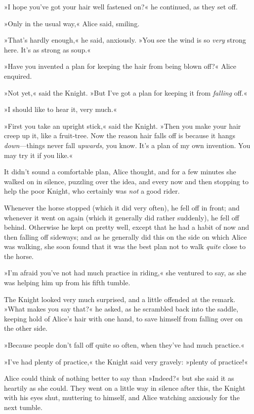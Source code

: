»I hope you've got your hair well fastened on?« he continued, as they set off.

»Only in the usual way,« Alice said, smiling.

»That's hardly enough,« he said, anxiously. »You see the wind is so \textit{very} strong here. It's as strong as soup.«

»Have you invented a plan for keeping the hair from being blown off?« Alice enquired.

»Not yet,« said the Knight. »But I've got a plan for keeping it from \textit{falling} off.«

»I should like to hear it, very much.«

»First you take an upright stick,« said the Knight. »Then you make your hair creep up it, like a fruit-tree. Now the reason hair falls off is because it hangs \textit{down}—things never fall \textit{upwards,} you know. It's a plan of my own invention. You may try it if you like.«

It didn't sound a comfortable plan, Alice thought, and for a few minutes she walked on in silence, puzzling over the idea, and every now and then stopping to help the poor Knight, who certainly was \textit{not} a good rider.

Whenever the horse stopped (which it did very often), he fell off in front; and whenever it went on again (which it generally did rather suddenly), he fell off behind. Otherwise he kept on pretty well, except that he had a habit of now and then falling off sideways; and as he generally did this on the side on which Alice was walking, she soon found that it was the best plan not to walk \textit{quite} close to the horse.

»I'm afraid you've not had much practice in riding,« she ventured to say, as she was helping him up from his fifth tumble.

The Knight looked very much surprised, and a little offended at the remark. »What makes you say that?« he asked, as he scrambled back into the saddle, keeping hold of Alice's hair with one hand, to save himself from falling over on the other side.

»Because people don't fall off quite so often, when they've had much practice.«

»I've had plenty of practice,« the Knight said very gravely: »plenty of practice!«

Alice could think of nothing better to say than »Indeed?« but she said it as heartily as she could. They went on a little way in silence after this, the Knight with his eyes shut, muttering to himself, and Alice watching anxiously for the next tumble.


